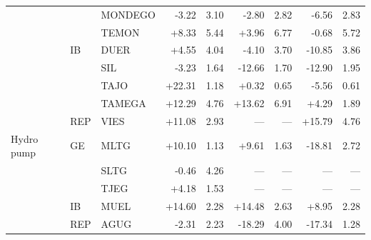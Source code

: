 \begin{tabular}{l l l r r r r r r}
 &  & MONDEGO & -3.22 & 3.10 & -2.80 & 2.82 & -6.56 & 2.83 \\
 &  & TEMON & +8.33 & 5.44 & +3.96 & 6.77 & -0.68 & 5.72 \\
 & IB & DUER & +4.55 & 4.04 & -4.10 & 3.70 & -10.85 & 3.86 \\
 &  & SIL & -3.23 & 1.64 & -12.66 & 1.70 & -12.90 & 1.95 \\
 &  & TAJO & +22.31 & 1.18 & +0.32 & 0.65 & -5.56 & 0.61 \\
 &  & TAMEGA & +12.29 & 4.76 & +13.62 & 6.91 & +4.29 & 1.89 \\
 & REP & VIES & +11.08 & 2.93 & --- & --- & +15.79 & 4.76 \\
\addlinespace
Hydro pump & GE & MLTG & +10.10 & 1.13 & +9.61 & 1.63 & -18.81 & 2.72 \\
 &  & SLTG & -0.46 & 4.26 & --- & --- & --- & --- \\
 &  & TJEG & +4.18 & 1.53 & --- & --- & --- & --- \\
 & IB & MUEL & +14.60 & 2.28 & +14.48 & 2.63 & +8.95 & 2.28 \\
 & REP & AGUG & -2.31 & 2.23 & -18.29 & 4.00 & -17.34 & 1.28 \\
\bottomrule
\end{tabular}